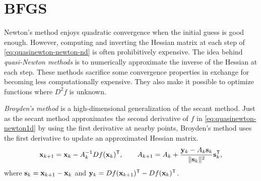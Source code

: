\section*{BFGS} %

Newton's method enjoys quadratic convergence when the initial guess is good enough.
However, computing and inverting the Hessian matrix at each step of \eqref{eq:quasinewton-newton-nd} is often prohibitively expensive.
The idea behind \emph{quasi-Newton methods} is to numerically approximate the inverse of the Hessian at each step.
These methods sacrifice some convergence properties in exchange for becoming less computationally expensive.
They also make it possible to optimize functions where $D^2f$ is unknown.

\emph{Broyden's method} is a high-dimensional generalization of the secant method.
Just as the secant method approximates the second derivative of $f$ in \eqref{eq:quasinewton-newton1d} by using the first derivative at nearby points, Broyden's method uses the first derivative to update an approximated Hessian matrix.
\begin{equation}
\mathbf{x}_{k+1} = \mathbf{x}_k - A_{k}^{-1}Df(\mathbf{x}_k)^{\mathsf T},
\qquad
A_{k+1} = A_k + \frac{\mathbf{y}_k-A_k\mathbf{s}_k}{\|\mathbf{s}_k\|^2}\mathbf{s}_k^{\mathsf T},
\label{eq:quasinewton-broyden}
\end{equation}
where $\mathbf{s}_k = \mathbf{x}_{k+1} - \mathbf{x}_{k}$ and $\mathbf{y}_k = Df(\mathbf{x}_{k+1})^{\mathsf T} - Df(\mathbf{x}_{k})^{\mathsf T}$.

